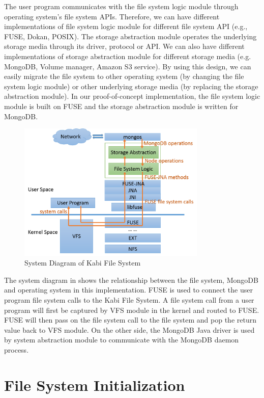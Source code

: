     The user program communicates with the file system logic module through operating system's file system APIs. Therefore, we can have different implementations of file system logic module for different file system API (e.g., FUSE, Dokan, POSIX). The storage abstraction module operates the underlying storage media through its driver, protocol or API. We can also have different implementations of storage abstraction module for different storage media (e.g. MongoDB, Volume manager, Amazon S3 service). By using this design, we can easily migrate the file system to other operating system (by changing the file system logic module) or other underlying storage media (by replacing the storage abstraction module). In our proof-of-concept implementation, the file system logic module is built on FUSE and the storage abstraction module is written for MongoDB. 

\begin{figure}[t]
\centering
\includegraphics[width=0.8\textwidth]{Chapter-3/figs/fig1.png}
\caption{System Diagram of Kabi File System}
\label{fig:diagram}
\end{figure}

    The system diagram in  shows the relationship between the file system, MongoDB and operating system in this implementation. FUSE is used to connect the user program file system calls to the Kabi File System. A file system call from a user program will first be captured by VFS module in the kernel and routed to FUSE. FUSE will then pass on the file system call to the file system and pop the return value back to VFS module. On the other side, the MongoDB Java driver is used by system abstraction module to communicate with the MongoDB daemon process.

\section{File System Initialization}

